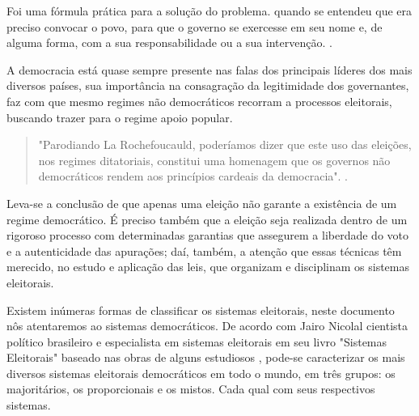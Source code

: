 Foi uma fórmula prática para a solução do problema. quando se entendeu que era
preciso convocar o povo, para que o governo se exercesse em seu nome e, 
de alguma forma, com a sua responsabilidade ou a sua intervenção.
\cite[Eleição e Sistemas Eleitorais]{sobrinho1958eleiccao}. \par
A democracia está quase sempre presente nas falas dos principais
líderes dos mais diversos países, sua importância na consagração da legitimidade
dos governantes, faz com que mesmo regimes não democráticos recorram a processos
eleitorais, buscando trazer para o regime apoio popular.\par
\begin{quote}
"Parodiando La Rochefoucauld, poderíamos dizer que este uso das eleições, nos 
regimes ditatoriais, constitui uma homenagem que os governos não democráticos
rendem aos princípios cardeais da democracia". \cite[Eleição e Sistemas Eleitorais]{sobrinho1958eleiccao}.
\end{quote} \par
Leva-se a conclusão de que apenas uma eleição não garante a existência de um
regime democrático. É preciso também que a eleição seja realizada dentro de um 
rigoroso processo com determinadas garantias que assegurem a liberdade do voto
e a autenticidade das apurações; daí, também, a atenção que essas técnicas têm
merecido, no estudo e aplicação das leis, que organizam e disciplinam os sistemas eleitorais. \par
Existem inúmeras formas de classificar os sistemas eleitorais, neste documento nôs atentaremos
ao sistemas democráticos. De acordo com Jairo Nicolal cientista político brasileiro
e especialista em sistemas eleitorais em seu livro "Sistemas Eleitorais" \cite{nicolau2015sistemas}
baseado nas obras de alguns estudiosos \cite{blais1997electoral},
pode-se caracterizar os mais diversos sistemas eleitorais democráticos em todo o mundo,
em três grupos: os majoritários, os proporcionais e os mistos. Cada qual com 
seus respectivos sistemas.

